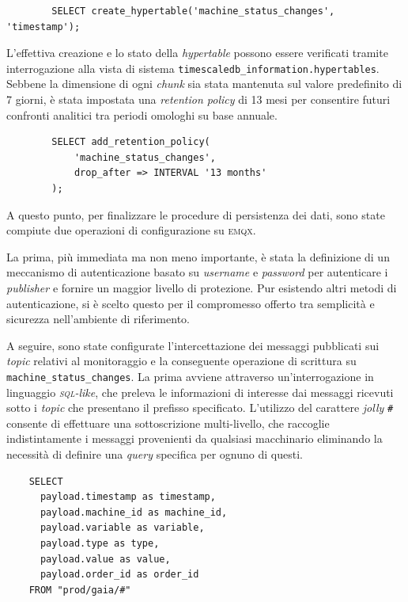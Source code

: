 \documentclass[12pt]{article}
\begin{document}
    \begin{verbatim}
        SELECT create_hypertable('machine_status_changes', 'timestamp');
    \end{verbatim}
    
    L'effettiva creazione e lo stato della \textit{hypertable} possono essere verificati tramite interrogazione alla vista di sistema \verb|timescaledb_information.hypertables|. Sebbene la dimensione di ogni \textit{chunk} sia stata mantenuta sul valore predefinito di 7 giorni, è stata impostata una \textit{retention policy} di 13 mesi per consentire futuri confronti analitici tra periodi omologhi su base annuale. \newline

    \begin{verbatim}
        SELECT add_retention_policy(
            'machine_status_changes',
            drop_after => INTERVAL '13 months'
        );
    \end{verbatim}

    A questo punto, per finalizzare le procedure di persistenza dei dati, sono state compiute due operazioni di configurazione su \textsc{emqx}.

    La prima, più immediata ma non meno importante, è stata la definizione di un meccanismo di autenticazione basato su \textit{username} e \textit{password} per autenticare i \textit{publisher} e fornire un maggior livello di protezione.
    Pur esistendo altri metodi di autenticazione, si è scelto questo per il compromesso offerto tra semplicità e sicurezza nell'ambiente di riferimento.
    
    A seguire, sono state configurate l'intercettazione dei messaggi pubblicati sui \textit{topic} relativi al monitoraggio e la conseguente operazione di scrittura su \verb|machine_status_changes|.
    La prima avviene attraverso un'interrogazione in linguaggio \textit{\textsc{sql}-like}, che preleva le informazioni di interesse dai messaggi ricevuti sotto i \textit{topic} che presentano il prefisso specificato. L'utilizzo del carattere \textit{jolly} \verb|#| consente di effettuare una sottoscrizione multi-livello, che raccoglie indistintamente i messaggi provenienti da qualsiasi macchinario eliminando la necessità di definire una \textit{query} specifica per ognuno di questi.
    
    \begin{verbatim}
    SELECT 
      payload.timestamp as timestamp,
      payload.machine_id as machine_id,
      payload.variable as variable, 
      payload.type as type,
      payload.value as value, 
      payload.order_id as order_id
    FROM "prod/gaia/#"
    \end{verbatim}
    
\end{document}
